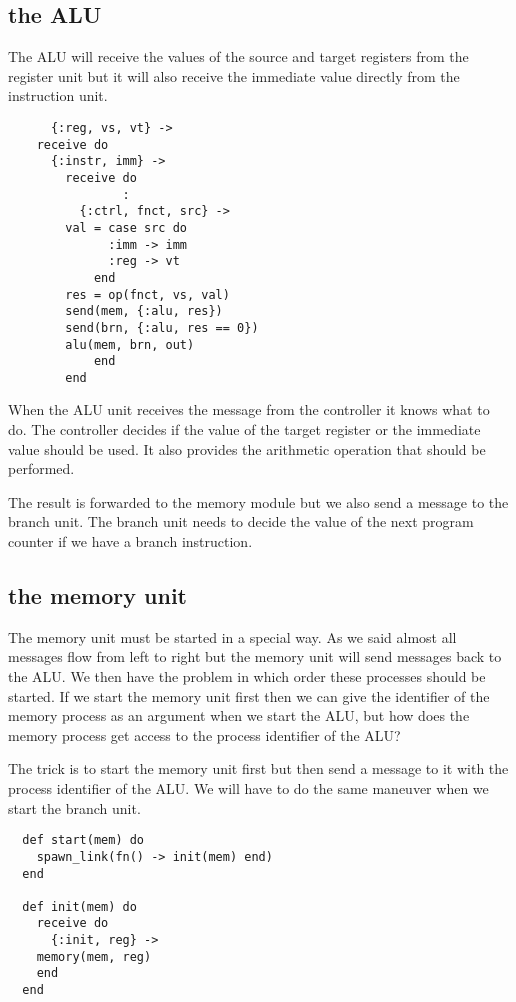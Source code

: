 \documentclass[a4paper,11pt]{article}
\begin{document}
\subsection*{the ALU}

The ALU will receive the values of the source and target registers
from the register unit but it will also receive the immediate value
directly from the instruction unit.

\begin{verbatim}
      {:reg, vs, vt} ->
	receive do
	  {:instr, imm} ->
	    receive do
                :
	      {:ctrl, fnct, src} ->
		val = case src do
		      :imm -> imm
		      :reg -> vt
		    end
		res = op(fnct, vs, val)
		send(mem, {:alu, res})
		send(brn, {:alu, res == 0})
		alu(mem, brn, out)
            end
        end
\end{verbatim}

When the ALU unit receives the message from the controller it knows
what to do. The controller decides if the value of the target register
or the immediate value should be used. It also provides the arithmetic
operation that should be performed.

The result is forwarded to the memory module but we also send a
message to the branch unit. The branch unit needs to decide the value
of the next program counter if we have a branch instruction.

\subsection*{the memory unit}

The memory unit must be started in a special way. As we said almost
all messages flow from left to right but the memory unit will send
messages back to the ALU. We then have the problem in which order these
processes should be started. If we start the memory unit first then we
can give the identifier of the memory process as an argument when we
start the ALU, but how does the memory process get access to the
process identifier of the ALU?

The trick is to start the memory unit first but then send a message
to it with the process identifier of the ALU. We will have to do the
same maneuver when we start the branch unit.

\begin{verbatim}
  def start(mem) do
    spawn_link(fn() -> init(mem) end)
  end

  def init(mem) do
    receive do
      {:init, reg} ->
	memory(mem, reg)
    end
  end
\end{verbatim}
\end{document}
